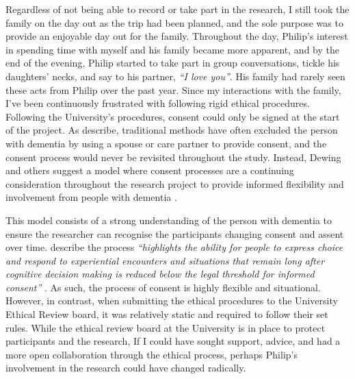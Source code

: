 Regardless of not being able to record or take part in the research, I still took the family on the day out as the trip had been planned, and the sole purpose was to provide an enjoyable day out for the family. Throughout the day, Philip's interest in spending time with myself and his family became more apparent, and by the end of the evening, Philip started to take part in group conversations, tickle his daughters' necks, and say to his partner, \textit{``I love you''}. His family had rarely seen these acts from Philip over the past year. Since my interactions with the family, I've been continuously frustrated with following rigid ethical procedures. Following the University's procedures, consent could only be signed at the start of the project. As \cite{dewing_participatory_2007} describe, traditional methods have often excluded the person with dementia by using a spouse or care partner to provide consent, and the consent process would never be revisited throughout the study. Instead, Dewing and others suggest a model where consent processes are a continuing consideration throughout the research project to provide informed flexibility and involvement from people with dementia \citep{dewing_participatory_2007,slaughter2007consent,mckeown_actively_2009}.

This model consists of a strong understanding of the person with dementia to ensure the researcher can recognise the participants changing consent and assent over time. \cite{haraldsdottir2019relational} describe the process \textit{``highlights the ability for people to express choice and respond to experiential encounters and situations that remain long after cognitive decision making is reduced below the legal threshold for informed consent''} \citep[pg. 4]{haraldsdottir2019relational}. As such, the process of consent is highly flexible and situational. However, in contrast, when submitting the ethical procedures to the University Ethical Review board, it was relatively static and required to follow their set rules. While the ethical review board at the University is in place to protect participants and the research, If I could have sought support, advice, and had a more open collaboration through the ethical process, perhaps Philip's involvement in the research could have changed radically.

